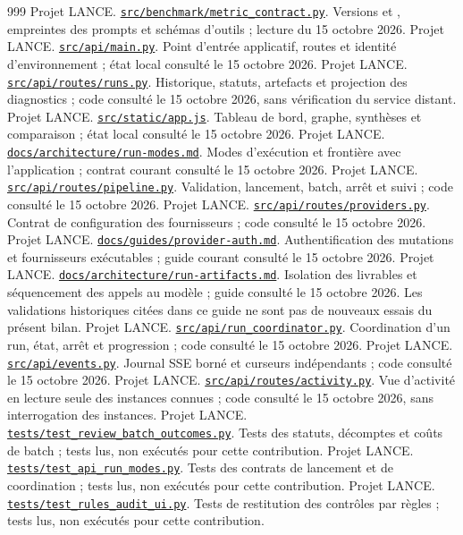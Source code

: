 \documentclass[11pt,a4paper]{article}
\DeclareRobustCommand{\code}[1]{{\small\path{#1}}}
\newcommand{\source}[2]{\href{../../#1}{\nolinkurl{#1}}. #2}
\begin{document}
\begin{thebibliography}{999}
 Projet LANCE. \source{src/benchmark/metric_contract.py}{Versions \code{strict-v3.16} et \code{evidence-v15}, empreintes des prompts et schémas d'outils ; lecture du 15 octobre 2026.}
 Projet LANCE. \source{src/api/main.py}{Point d'entrée applicatif, routes et identité d'environnement ; état local consulté le 15 octobre 2026.}
 Projet LANCE. \source{src/api/routes/runs.py}{Historique, statuts, artefacts et projection des diagnostics ; code consulté le 15 octobre 2026, sans vérification du service distant.}
 Projet LANCE. \source{src/static/app.js}{Tableau de bord, graphe, synthèses et comparaison ; état local consulté le 15 octobre 2026.}
 Projet LANCE. \source{docs/architecture/run-modes.md}{Modes d'exécution et frontière avec l'application ; contrat courant consulté le 15 octobre 2026.}
 Projet LANCE. \source{src/api/routes/pipeline.py}{Validation, lancement, batch, arrêt et suivi ; code consulté le 15 octobre 2026.}
 Projet LANCE. \source{src/api/routes/providers.py}{Contrat de configuration des fournisseurs ; code consulté le 15 octobre 2026.}
 Projet LANCE. \source{docs/guides/provider-auth.md}{Authentification des mutations et fournisseurs exécutables ; guide courant consulté le 15 octobre 2026.}
 Projet LANCE. \source{docs/architecture/run-artifacts.md}{Isolation des livrables et séquencement des appels au modèle ; guide consulté le 15 octobre 2026. Les validations historiques citées dans ce guide ne sont pas de nouveaux essais du présent bilan.}
 Projet LANCE. \source{src/api/run_coordinator.py}{Coordination d'un run, état, arrêt et progression ; code consulté le 15 octobre 2026.}
 Projet LANCE. \source{src/api/events.py}{Journal SSE borné et curseurs indépendants ; code consulté le 15 octobre 2026.}
 Projet LANCE. \source{src/api/routes/activity.py}{Vue d'activité en lecture seule des instances connues ; code consulté le 15 octobre 2026, sans interrogation des instances.}
 Projet LANCE. \source{tests/test_review_batch_outcomes.py}{Tests des statuts, décomptes et coûts de batch ; tests lus, non exécutés pour cette contribution.}
 Projet LANCE. \source{tests/test_api_run_modes.py}{Tests des contrats de lancement et de coordination ; tests lus, non exécutés pour cette contribution.}
 Projet LANCE. \source{tests/test_rules_audit_ui.py}{Tests de restitution des contrôles par règles ; tests lus, non exécutés pour cette contribution.}

\end{thebibliography}
\end{document}
